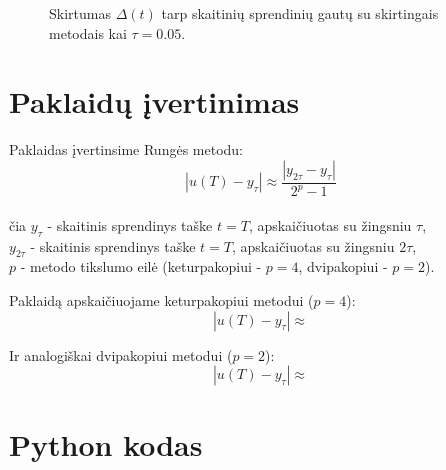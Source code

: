 \documentclass[]{VUMIFTemplateClass}
\newcommand{\ttwo}{0.05}
\begin{document}
\begin{figure}[H]
    \begin{center}
        
    \end{center}
    \caption{Skirtumas $\Delta(t)$ tarp skaitinių sprendinių gautų su skirtingais metodais kai $\tau = \ttwo$.}
\end{figure}

\section{Paklaidų įvertinimas}
Paklaidas įvertinsime Rungės metodu:
\[ |u(T) - y_{\tau}| \approx \frac{|y_{2 \tau} - y_{\tau}|}{2^p - 1} \]\\
čia $y_{\tau}$ - skaitinis sprendinys taške $t = T$, apskaičiuotas su žingsniu $\tau$,\\
$y_{2 \tau}$ - skaitinis sprendinys taške $t = T$, apskaičiuotas su žingsniu $2 \tau$,\\
$p$ - metodo tikslumo eilė (keturpakopiui - $p = 4$, dvipakopiui - $p = 2$).

\vspace{1.2cm}
Paklaidą apskaičiuojame keturpakopiui metodui ($p = 4$):
\[ |u(T) - y_{\tau}| \approx  \]

Ir analogiškai dvipakopiui metodui ($p = 2$):
\[ |u(T) - y_{\tau}| \approx  \]

\section{Python kodas}
\end{document}
